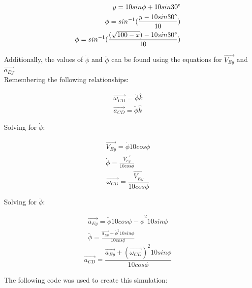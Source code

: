 \documentclass[12pt, a4paper]{article}
\begin{document}
\begin{align}
    y = 10sin\phi + 10sin30\degree \\ 
    \phi = sin^{-1}(\frac{y-10sin30\degree}{10}) \\ 
    \phi = sin^{-1}(\frac{(\sqrt{100-x})-10sin30\degree}{10})
\end{align}

Additionally, the values of $\dot\phi$ and $\ddot\phi$ can be found using the equations for $\vec{V_{Ey}}$ and $\vec{a_{Ey}}$. \\ 

Remembering the following relationships: 

\begin{align*}
    \vec{\omega_{CD}}=\dot\phi\hat{k}\\ \vec{a_{CD}}=\ddot\phi\hat{k}
\end{align*}

Solving for $\dot\phi$:

\begin{align*}
    \vec{V_{Ey}} = \dot\phi 10cos\phi \\ 
    \dot\phi = \frac{\vec{V_{Ey}}}{10 cos\phi}
\end{align*}
\begin{equation}
    \vec{\omega_{CD}} = \frac{\vec{V_{Ey}}}{10 cos\phi}
\end{equation}

Solving for $\ddot\phi$:

\begin{align*}
    \vec{a_{Ey}} = \ddot\phi 10cos\phi - \dot\phi^2 10sin\phi \\ 
    \ddot\phi = \frac{\vec{a_{Ey}}+\dot\phi^2 10sin\phi}{10cos\phi}
\end{align*}
\begin{equation}
    \vec{a_{CD}} = \frac{\vec{a_{Ey}}+(\vec{\omega_{CD}})^2 10sin\phi}{10cos\phi}
\end{equation}

The following code was used to create this simulation: \\ \\ \\ 
\end{document}

